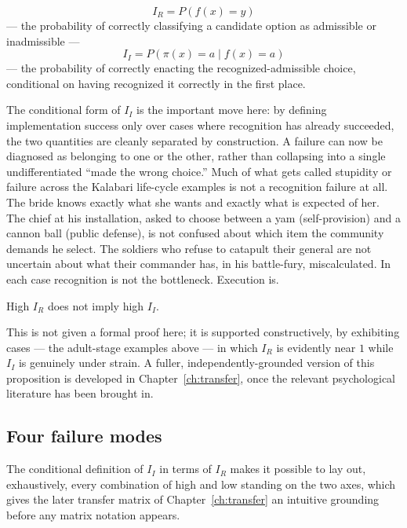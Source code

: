 \begin{definition}
\[
I_R = P(f(x) = y)
\]
--- the probability of correctly classifying a candidate option as admissible or inadmissible ---
\[
I_I = P(\pi(x) = a \mid f(x) = a)
\]
--- the probability of correctly enacting the recognized-admissible choice, conditional on having recognized it correctly in the first place.
\end{definition}

The conditional form of $I_I$ is the important move here: by defining implementation success only over cases where recognition has already succeeded, the two quantities are cleanly separated by construction. A failure can now be diagnosed as belonging to one or the other, rather than collapsing into a single undifferentiated ``made the wrong choice.'' Much of what gets called stupidity or failure across the Kalabari life-cycle examples is not a recognition failure at all. The bride knows exactly what she wants and exactly what is expected of her. The chief at his installation, asked to choose between a yam (self-provision) and a cannon ball (public defense), is not confused about which item the community demands he select. The soldiers who refuse to catapult their general are not uncertain about what their commander has, in his battle-fury, miscalculated. In each case recognition is not the bottleneck. Execution is.

\begin{proposition}[Dissociation]
High $I_R$ does not imply high $I_I$.
\end{proposition}

This is not given a formal proof here; it is supported constructively, by exhibiting cases --- the adult-stage examples above --- in which $I_R$ is evidently near $1$ while $I_I$ is genuinely under strain. A fuller, independently-grounded version of this proposition is developed in Chapter~\ref{ch:transfer}, once the relevant psychological literature has been brought in.

\subsection*{Four failure modes}

The conditional definition of $I_I$ in terms of $I_R$ makes it possible to lay out, exhaustively, every combination of high and low standing on the two axes, which gives the later transfer matrix of Chapter~\ref{ch:transfer} an intuitive grounding before any matrix notation appears.

